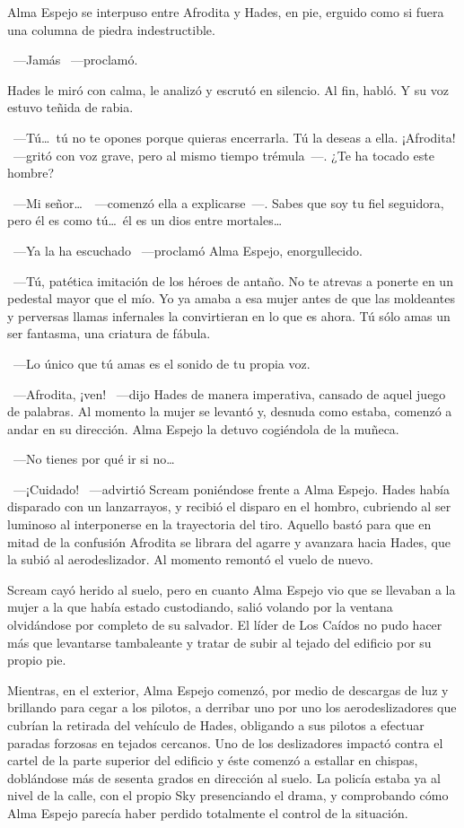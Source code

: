 Alma Espejo se interpuso entre Afrodita y Hades, en pie, erguido como si fuera una columna de piedra indestructible.

~---Jamás ~---proclamó.

Hades le miró con calma, le analizó y escrutó en silencio. Al fin, habló. Y su voz estuvo teñida de rabia.

~---Tú\dots\ tú no te opones porque quieras encerrarla. Tú la deseas a ella. ¡Afrodita! ~---gritó con voz grave, pero al mismo tiempo trémula~---. ¿Te ha tocado este hombre?

~---Mi señor\dots\ ~---comenzó ella a explicarse~---. Sabes que soy tu fiel seguidora, pero él es como tú\dots\ él es un dios entre mortales\dots

~---Ya la ha escuchado ~---proclamó Alma Espejo, enorgullecido.

~---Tú, patética imitación de los héroes de antaño. No te atrevas a ponerte en un pedestal mayor que el mío. Yo ya amaba a esa mujer antes de que las moldeantes y perversas llamas infernales la convirtieran en lo que es ahora. Tú sólo amas un ser fantasma, una criatura de fábula.

~---Lo único que tú amas es el sonido de tu propia voz.

~---Afrodita, ¡ven! ~---dijo Hades de manera imperativa, cansado de aquel juego de palabras. Al momento la mujer se levantó y, desnuda como estaba, comenzó a andar en su dirección. Alma Espejo la detuvo cogiéndola de la muñeca.

~---No tienes por qué ir si no\dots

~---¡Cuidado! ~---advirtió Scream poniéndose frente a Alma Espejo. Hades había disparado con un lanzarrayos, y recibió el disparo en el hombro, cubriendo al ser luminoso al interponerse en la trayectoria del tiro. Aquello bastó para que en mitad de la confusión Afrodita se librara del agarre y avanzara hacia Hades, que la subió al aerodeslizador. Al momento remontó el vuelo de nuevo.

Scream cayó herido al suelo, pero en cuanto Alma Espejo vio que se llevaban a la mujer a la que había estado custodiando, salió volando por la ventana olvidándose por completo de su salvador. El líder de Los Caídos no pudo hacer más que levantarse tambaleante y tratar de subir al tejado del edificio por su propio pie.

Mientras, en el exterior, Alma Espejo comenzó, por medio de descargas de luz y brillando para cegar a los pilotos, a derribar uno por uno los aerodeslizadores que cubrían la retirada del vehículo de Hades, obligando a sus pilotos a efectuar paradas forzosas en tejados cercanos. Uno de los deslizadores impactó contra el cartel de la parte superior del edificio y éste comenzó a estallar en chispas, doblándose más de sesenta grados en dirección al suelo. La policía estaba ya al nivel de la calle, con el propio Sky presenciando el drama, y comprobando cómo Alma Espejo parecía haber perdido totalmente el control de la situación.

